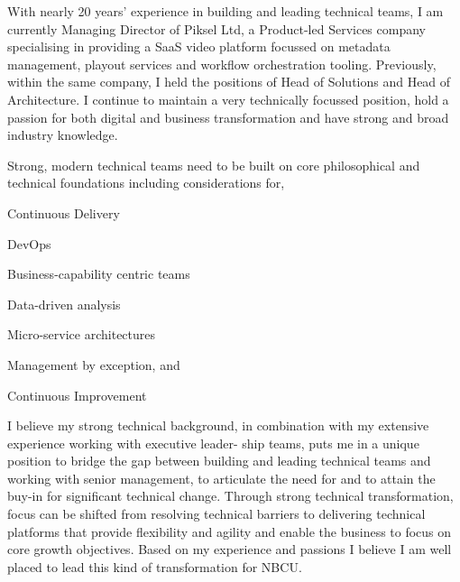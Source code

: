 \documentclass[11pt, a4paper]{awesome-cv} %
\begin{document}
\makecvheader %

\makelettertitle %


\begin{cvletter}



With nearly 20 years’ experience in building and leading technical teams, I am currently Managing Director of Piksel Ltd, a Product-led Services company specialising in providing a SaaS video platform focussed on metadata management, playout services and workflow orchestration tooling. Previously, within the same company, I held the positions of Head of Solutions and Head of Architecture. I continue to maintain a very technically focussed position, hold a passion for both digital and business transformation and have strong and broad industry knowledge.



Strong, modern technical teams need to be built on core philosophical and technical foundations including considerations for,

\vspace{3.4mm}

\begin{cvitems}
\item {Continuous Delivery}
\item {DevOps}
\item {Business-capability centric teams}
\item {Data-driven analysis}
\item {Micro-service architectures}
\item {Management by exception, and}
\item {Continuous Improvement}
\end{cvitems}

\vspace{3.4mm}

I believe my strong technical background, in combination with my extensive experience working with executive leader- ship teams, puts me in a unique position to bridge the gap between building and leading technical teams and working with senior management, to articulate the need for and to attain the buy-in for significant technical change.
Through strong technical transformation, focus can be shifted from resolving technical barriers to delivering technical platforms that provide flexibility and agility and enable the business to focus on core growth objectives.
Based on my experience and passions I believe I am well placed to lead this kind of transformation for NBCU.


\end{cvletter}


\makeletterclosing %
\end{document}
